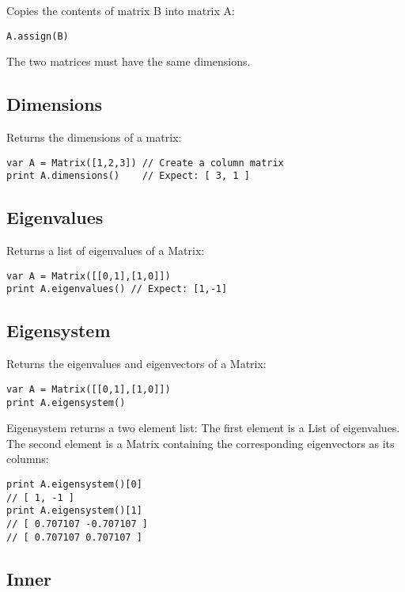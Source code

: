 Copies the contents of matrix B into matrix A:

\begin{lstlisting}
A.assign(B)
\end{lstlisting}

The two matrices must have the same dimensions.

\hypertarget{dimensions}{%
\subsection{Dimensions}\label{dimensions}}

Returns the dimensions of a matrix:

\begin{lstlisting}
var A = Matrix([1,2,3]) // Create a column matrix 
print A.dimensions()    // Expect: [ 3, 1 ]
\end{lstlisting}

\hypertarget{eigenvalues}{%
\subsection{Eigenvalues}\label{eigenvalues}}

Returns a list of eigenvalues of a Matrix:

\begin{lstlisting}
var A = Matrix([[0,1],[1,0]])
print A.eigenvalues() // Expect: [1,-1]
\end{lstlisting}

\hypertarget{eigensystem}{%
\subsection{Eigensystem}\label{eigensystem}}

Returns the eigenvalues and eigenvectors of a Matrix:

\begin{lstlisting}
var A = Matrix([[0,1],[1,0]])
print A.eigensystem() 
\end{lstlisting}

Eigensystem returns a two element list: The first element is a List of
eigenvalues. The second element is a Matrix containing the corresponding
eigenvectors as its columns:

\begin{lstlisting}
print A.eigensystem()[0]
// [ 1, -1 ]
print A.eigensystem()[1]
// [ 0.707107 -0.707107 ]
// [ 0.707107 0.707107 ]
\end{lstlisting}

\hypertarget{inner}{%
\subsection{Inner}\label{inner}}

